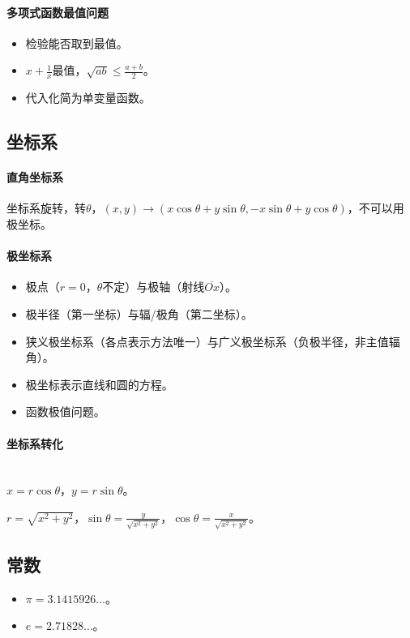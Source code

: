 \documentclass[
12pt, %
a4paper, 
oneside, %
headinclude,footinclude, %
]{scrartcl}
\begin{document}
\paragraph{多项式函数最值问题}
\begin{itemize}
\item 检验能否取到最值。
\item $ x + \frac{1}{x} $最值，$ \sqrt{ab}\leq \frac{a + b}{2}$。
\item 代入化简为单变量函数。
\end{itemize}
\subsection[坐标系]{坐标系}
\paragraph{直角坐标系}
坐标系旋转，转$ \theta $，$ (x, y) \to (x\cos\theta + y\sin\theta, -x\sin\theta + y\cos\theta) $，不可以用极坐标。
\paragraph{极坐标系}
\begin{itemize}
\item 极点（$ r = 0 $，$ \theta $不定）与极轴（射线$ \overline{Ox} $）。
\item 极半径（第一坐标）与辐/极角（第二坐标）。
\item 狭义极坐标系（各点表示方法唯一）与广义极坐标系（负极半径，非主值辐角）。
\item 极坐标表示直线和圆的方程。
\item 函数极值问题。
\end{itemize}
\paragraph{坐标系转化}~\\

$ x = r\cos\theta $，$ y = r\sin\theta $。

$ r = \sqrt{x^2 + y^2} $，$ \sin\theta = \frac{y}{\sqrt{x^2 + y^2}} $，$ \cos\theta = \frac{x}{\sqrt{x^2 + y^2}} $。
\subsection[常数]{常数}
\begin{itemize}
\item $ \pi = 3.1415926 \dots $。
\item $ e = 2.71828 \dots $。
\end{itemize}
\end{document}
